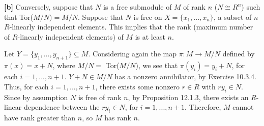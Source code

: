 \textbf{[b]} Conversely, suppose that $N$ is a free submodule of $M$ of rank $n$ ($N \cong R^n$) such that Tor($M/N) = M/N$. Suppose that $N$ is free on $X = \{x_1,...,x_n\}$, a subset of $n$ $R$-linearly independent elements. This implies that the rank (maximum number of $R$-linearly independent elements) of $M$ is at least $n$.

Let $Y = \{y_1,...,y_{n+1}\} \subseteq M$. Considering again the map $\pi: M \rightarrow M/N$ defined by $\pi(x) = x + N$, where $M/N =$ Tor($M/N$), we see that $\pi(y_i) = y_i + N$, for each $i = 1,...,n+1$. $Y + N \in M/N$ has a nonzero annihilator, by Exercise 10.3.4. Thus, for each $i = 1,...,n+1$, there exists some nonzero $r \in R$ with $ry_i \in N$. Since by assumption $N$ is free of rank $n$, by Proposition 12.1.3, there exists an $R$-linear dependence between the $ry_i \in N$, for $i = 1,...,n+1$. Therefore, $M$ cannot have rank greater than $n$, so $M$ has rank $n$.